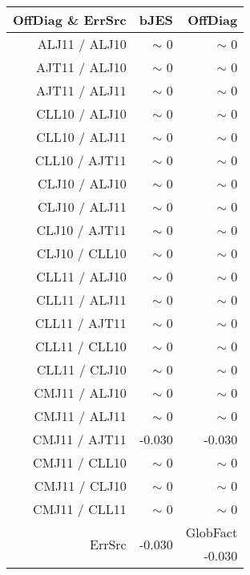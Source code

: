 \begin{table}[H]
\scriptsize
\begin{center}
\renewcommand{\arraystretch}{1.1}
\begin{tabular}{|r|r|r|}
\hline
 OffDiag \& ErrSrc & {\tiny bJES} & OffDiag\\
\hline
ALJ11 / ALJ10 &  {\tiny $\sim$ }0 &  {\tiny $\sim$ }0 \\
AJT11 / ALJ10 &  {\tiny $\sim$ }0 &  {\tiny $\sim$ }0 \\
AJT11 / ALJ11 &  {\tiny $\sim$ }0 &  {\tiny $\sim$ }0 \\
CLL10 / ALJ10 &  {\tiny $\sim$ }0 &  {\tiny $\sim$ }0 \\
CLL10 / ALJ11 &  {\tiny $\sim$ }0 &  {\tiny $\sim$ }0 \\
CLL10 / AJT11 &  {\tiny $\sim$ }0 &  {\tiny $\sim$ }0 \\
CLJ10 / ALJ10 &  {\tiny $\sim$ }0 &  {\tiny $\sim$ }0 \\
CLJ10 / ALJ11 &  {\tiny $\sim$ }0 &  {\tiny $\sim$ }0 \\
CLJ10 / AJT11 &  {\tiny $\sim$ }0 &  {\tiny $\sim$ }0 \\
CLJ10 / CLL10 &  {\tiny $\sim$ }0 &  {\tiny $\sim$ }0 \\
CLL11 / ALJ10 &  {\tiny $\sim$ }0 &  {\tiny $\sim$ }0 \\
CLL11 / ALJ11 &  {\tiny $\sim$ }0 &  {\tiny $\sim$ }0 \\
CLL11 / AJT11 &  {\tiny $\sim$ }0 &  {\tiny $\sim$ }0 \\
CLL11 / CLL10 &  {\tiny $\sim$ }0 &  {\tiny $\sim$ }0 \\
CLL11 / CLJ10 &  {\tiny $\sim$ }0 &  {\tiny $\sim$ }0 \\
CMJ11 / ALJ10 &  {\tiny $\sim$ }0 &  {\tiny $\sim$ }0 \\
CMJ11 / ALJ11 &  {\tiny $\sim$ }0 &  {\tiny $\sim$ }0 \\
CMJ11 / AJT11 &     -0.030 &     -0.030 \\
CMJ11 / CLL10 &  {\tiny $\sim$ }0 &  {\tiny $\sim$ }0 \\
CMJ11 / CLJ10 &  {\tiny $\sim$ }0 &  {\tiny $\sim$ }0 \\
CMJ11 / CLL11 &  {\tiny $\sim$ }0 &  {\tiny $\sim$ }0 \\
\hline
\multirow{2}{*}{ErrSrc} & \multirow{2}{*}{    -0.030} & GlobFact\\
 & &     -0.030 \\
\hline
\end{tabular}
\renewcommand{\arraystretch}{1}

\end{center}
\end{table}
